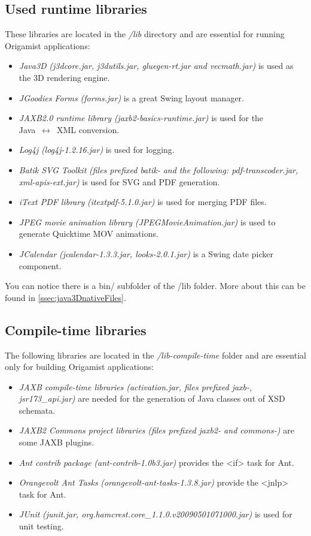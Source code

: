 \subsection{Used runtime libraries}
These libraries are located in the \emph{/lib} directory and are essential for running Origamist applications:
\begin{itemize}
\item \emph{Java3D} \textit{(j3dcore.jar, j3dutils.jar, gluegen-rt.jar and vecmath.jar)} is used as the 3D rendering engine.
\item \emph{JGoodies Forms} \textit{(forms.jar)} is a great Swing layout manager.
\item \emph{JAXB2.0 runtime library} \textit{(jaxb2-basics-runtime.jar)} is used for the \\
Java~$\leftrightarrow$~XML conversion.
\item \emph{Log4j} \textit{(log4j-1.2.16.jar)} is used for logging.
\item \emph{Batik SVG Toolkit} \textit{(files prefixed batik- and the following: pdf-transcoder.jar, xml-apis-ext.jar)} is used for SVG and PDF generation.
\item \emph{iText PDF library} \textit{(itextpdf-5.1.0.jar)} is used for merging PDF files.
\item \emph{JPEG movie animation library} \textit{(JPEGMovieAnimation.jar)} is used to generate Quicktime MOV animations.
\item \emph{JCalendar} \textit{(jcalendar-1.3.3.jar, looks-2.0.1.jar)} is a Swing date picker component.
\end{itemize}

You can notice there is a bin/ subfolder of the /lib folder. More about this can be found in \ref{ssec:java3DnativeFiles}.

\subsection{Compile-time libraries}
The following libraries are located in the \emph{/lib-compile-time} folder and are essential only for building Origamist applications:
\begin{itemize}
\item \emph{JAXB compile-time libraries} \textit{(activation.jar, files prefixed jaxb-, \\
jsr173\_api.jar)} are needed for the generation of Java classes out of XSD schemata.
\item \emph{JAXB2 Commons project libraries} \textit{(files prefixed jaxb2- and commons-)} are some JAXB plugins.
\item \emph{Ant contrib package} \textit{(ant-contrib-1.0b3.jar)} provides the <if> task for Ant.
\item \emph{Orangevolt Ant Tasks} \textit{(orangevolt-ant-tasks-1.3.8.jar)} provide the <jnlp> task for Ant.
\item \emph{JUnit} \textit{(junit.jar, org.hamcrest.core\_1.1.0.v20090501071000.jar)} is used for unit testing.
\end{itemize}

